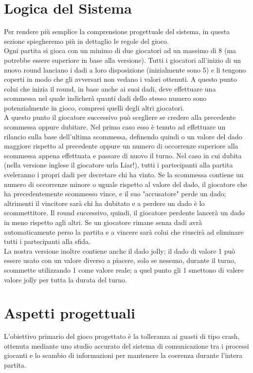 \documentclass{llncs}
\begin{document}
	\section{Logica del Sistema}
		Per rendere più semplice la comprensione progettuale del sistema, in questa sezione spiegheremo più in dettaglio le regole del gioco. \\
		Ogni partita si gioca con un minimo di due giocatori ad un massimo di 8 (ma potrebbe essere superiore in base alla versione). Tutti i giocatori all'inizio di un nuovo round lanciano i dadi a loro disposizione (inizialmente sono 5) e li tengono coperti in modo che gli avversari non vedano i valori ottenuti. A questo punto colui che inizia il round, in base anche ai suoi dadi, deve effettuare una scommessa nel quale indicherà quanti dadi dello stesso numero sono potenzialmente in gioco, compresi quelli degli altri giocatori.\\ A questo punto il giocatore successivo può scegliere se credere alla precedente scommessa oppure dubitare. Nel primo caso esso è tenuto ad effettuare un rilancio sulla base dell'ultima scommessa, definendo quindi o un valore del dado maggiore rispetto al precedente oppure un numero di occorrenze superiore alla scommessa appena effettuata e passare di nuovo il turno. Nel caso in cui dubita (nella versione inglese il giocatore urla Liar!), tutti i partecipanti alla partita sveleranno i propri dadi per decretare chi ha vinto. Se la scommessa contiene un numero di occorrenze minore o uguale rispetto al valore del dado, il giocatore che ha precedentemente scommesso vince, e il suo "accusatore" perde un dado; altrimenti il vincitore sarà chi ha dubitato e a perdere un dado è lo scommettitore. Il round successivo, quindi, il giocatore perdente lancerà un dado in meno rispetto agli altri. Se un giocatore rimane senza dadi avrà automaticamente perso la partita e a vincere sarà colui che riuscirà ad eliminare tutti i partecipanti alla sfida.\\
		La nostra versione inoltre contiene anche il dado jolly: il dado di valore 1 può essere usato con un valore diverso a piacere, solo se nessuno, durante il turno, scommette utilizzando 1 come valore reale; a quel punto gli 1 smettono di valere valore jolly per tutta la durata del turno.
	
\section{Aspetti progettuali}
L'obiettivo primario del gioco progettato è la tolleranza ai guasti di tipo crash, ottenuta mediante uno studio accurato del sistema di comunicazione tra i processi giocanti e lo scambio di informazioni per mantenere la coerenza durante l'intera partita.\\
\end{document}
